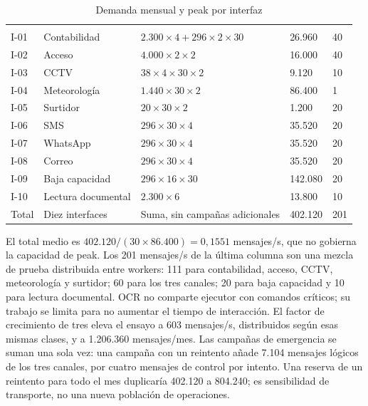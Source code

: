 \begin{longtable}{|L{\dimexpr.09\arrayrulewidth\relax}|L{\dimexpr.20\arrayrulewidth\relax}|L{\dimexpr.35\arrayrulewidth\relax}|L{\dimexpr.19\arrayrulewidth\relax}|L{\dimexpr.17\arrayrulewidth\relax}|}
\caption{Demanda mensual y peak por interfaz}\label{tab:integraciones-volumen}\\
\hline
{} &  &  &  & \\ \hline
\endfirsthead
\hline
{} &  &  &  & \\ \hline
\endhead
I-01 & Contabilidad & $2.300\times4+296\times2\times30$ & 26.960 & 40\\ \hline
I-02 & Acceso & $4.000\times2\times2$ & 16.000 & 40\\ \hline
I-03 & CCTV & $38\times4\times30\times2$ & 9.120 & 10\\ \hline
I-04 & Meteorología & $1.440\times30\times2$ & 86.400 & 1\\ \hline
I-05 & Surtidor & $20\times30\times2$ & 1.200 & 20\\ \hline
I-06 & SMS & $296\times30\times4$ & 35.520 & 20\\ \hline
I-07 & WhatsApp & $296\times30\times4$ & 35.520 & 20\\ \hline
I-08 & Correo & $296\times30\times4$ & 35.520 & 20\\ \hline
I-09 & Baja capacidad & $296\times16\times30$ & 142.080 & 20\\ \hline
I-10 & Lectura documental & $2.300\times6$ & 13.800 & 10\\ \hline
Total & Diez interfaces & Suma, sin campañas adicionales & 402.120 & 201\\ \hline
\end{longtable}

El total medio es $402.120/(30\times86.400)=0,1551$ mensajes/s, que no gobierna la capacidad de peak. Los 201 mensajes/s de la última columna son una mezcla de prueba distribuida entre workers: 111 para contabilidad, acceso, CCTV, meteorología y surtidor; 60 para los tres canales; 20 para baja capacidad y 10 para lectura documental. OCR no comparte ejecutor con comandos críticos; su trabajo se limita para no aumentar el tiempo de interacción. El factor de crecimiento de tres eleva el ensayo a 603 mensajes/s, distribuidos según esas mismas clases, y a 1.206.360 mensajes/mes. Las campañas de emergencia se suman una sola vez: una campaña con un reintento añade 7.104 mensajes lógicos de los tres canales, por cuatro mensajes de control por intento. Una reserva de un reintento para todo el mes duplicaría 402.120 a 804.240; es sensibilidad de transporte, no una nueva población de operaciones.

